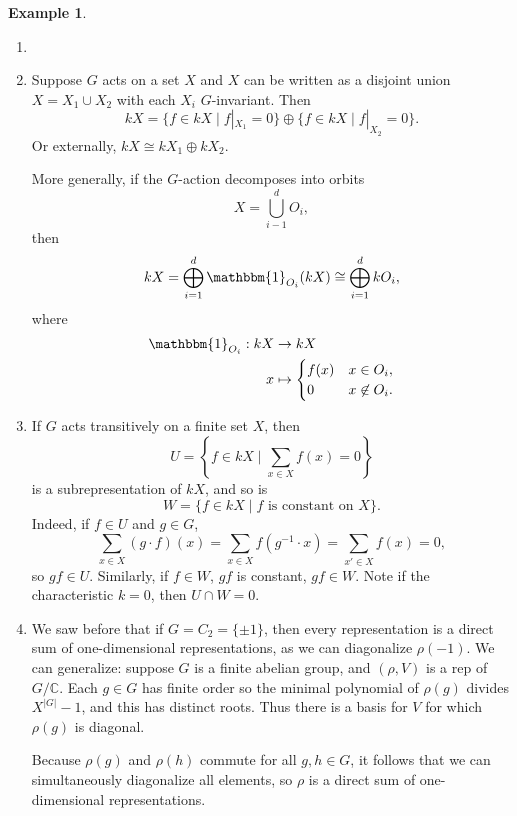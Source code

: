 \documentclass[12pt]{article}
\theoremstyle{definition}
\newtheorem{example}{Example}[section]
\theoremstyle{remark}
\begin{document}
\begin{example}
	\begin{enumerate}[(1)]
		\item[]
		\item Suppose $G$ acts on a set $X$ and $X$ can be written as a disjoint union $X = X_1 \cup X_2$ with each $X_i$ $G$-invariant. Then
	\[
		kX = \{f \in kX \mid f|_{X_1} = 0\} \oplus \{f \in kX \mid f|_{X_2} = 0\}
	.\]
	Or externally, $kX \cong kX_1 \oplus kX_2$.

	More generally, if the $G$-action decomposes into orbits
	\[
	X = \bigcup_{i - 1}^{d} O_i
	,\]
	then
	\[
		kX = \bigoplus_{i = 1}^{d} \mathbbm{1}_{O_i}(kX) \cong \bigoplus_{i = 1}^{d} kO_i
	,\]
	where
	\begin{align*}
		\mathbbm{1}_{O_i} : kX &\to kX \\
		x &\mapsto
		\begin{cases}
			f(x) & x \in O_i, \\
			0 & x \not \in O_i.
		\end{cases}
	\end{align*}
\item If $G$ acts transitively on a finite set $X$, then
	\[
		U = \left\{ f \in kX \mid \sum_{x \in X}f(x) = 0 \right\}
	\]
	is a subrepresentation of $kX$, and so is
	\[
		W = \{f \in kX \mid f \text{ is constant on } X \}
	.\]
	Indeed, if $f \in U$ and $g \in G$,
	\[
		\sum_{x \in X} (g \cdot f)(x) = \sum_{x \in X}f(g^{-1} \cdot x) = \sum_{x' \in X}f(x) = 0
	,\]
	so $gf \in U$. Similarly, if $f \in W$, $gf$ is constant, $gf \in W$. Note if the characteristic $k = 0$, then $U \cap W = 0$.
\item We saw before that if $G = C_2 = \{\pm 1\}$, then every representation is a direct sum of one-dimensional representations, as we can diagonalize $\rho(-1)$. We can generalize: suppose $G$ is a finite abelian group, and $(\rho, V)$ is a rep of $G / \mathbb{C}$. Each $g \in G$ has finite order so the minimal polynomial of $\rho(g)$ divides $X^{|G|} - 1$, and this has distinct roots. Thus there is a basis for $V$ for which $\rho(g)$ is diagonal.

	Because $\rho(g)$ and $\rho(h)$ commute for all $g, h \in G$, it follows that we can simultaneously diagonalize all elements, so $\rho$ is a direct sum of one-dimensional representations.

\end{enumerate}
\end{example}
\end{document}
